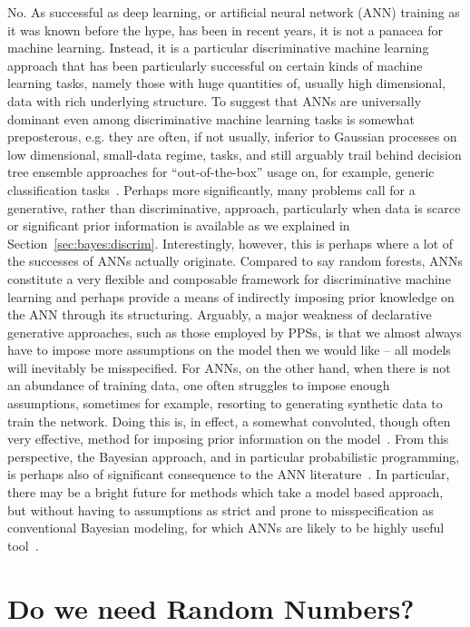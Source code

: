 No.  As successful as deep learning, or artificial neural network (ANN) training as it was known before the hype,
has been in recent years, it is not a panacea for machine learning.  Instead, it is a particular discriminative
machine learning approach that has been particularly successful on certain kinds of machine learning tasks,
namely those with huge quantities of, usually high dimensional, data with rich underlying structure.   
To suggest that ANNs are universally dominant even among discriminative machine learning tasks is
somewhat preposterous, e.g. they are often, if not usually, inferior to Gaussian processes on low dimensional,
small-data regime, tasks, and still arguably trail behind decision tree ensemble approaches for ``out-of-the-box''
usage on, for example, generic classification tasks~\citep{rainforth2015canonical}.   Perhaps more significantly,
many problems call for a generative, rather than discriminative, approach,
particularly when data is scarce or significant prior information is available as we explained
in Section~\ref{sec:bayes:discrim}.  Interestingly, however, this is perhaps
where a lot of the successes of ANNs actually originate.  Compared to say random forests, ANNs constitute a very
flexible and composable framework for discriminative machine learning and perhaps provide a means of 
indirectly imposing prior knowledge on the ANN through its structuring.  Arguably, a major weakness of
declarative generative approaches, such as those employed by PPSs, is that we almost
always have to impose more assumptions on the model then we would like -- all models will inevitably be
misspecified.  For ANNs, on the other hand, when there is not an abundance of training data,
one often struggles to impose enough assumptions, sometimes
for example, resorting to generating synthetic data to train the network.  Doing this is, in effect, a somewhat convoluted,
though often very effective, method for imposing prior information on the model~\citep{le2017using}.  From this
perspective, the Bayesian approach, and in particular probabilistic programming, is perhaps also of significant
consequence to the ANN literature~\citep{gal2016uncertainty}.
In particular, there may be a bright future for methods which
take a model based approach, but without having to assumptions as strict and prone to misspecification
as conventional Bayesian modeling, for which ANNs are likely to be highly useful tool~\citep{siddharth2017learning}.

\section{Do we need Random Numbers?}

